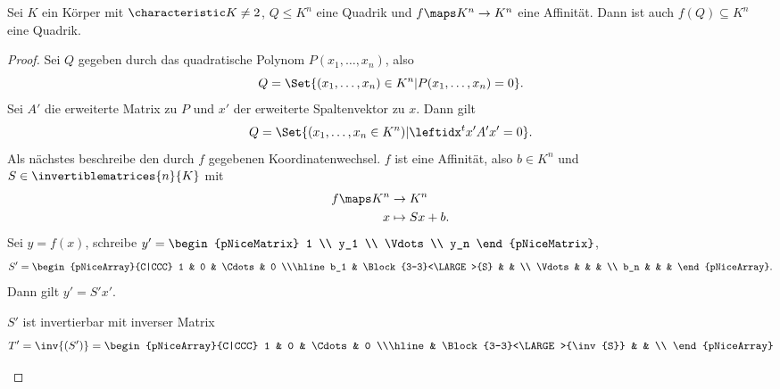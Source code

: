 \begin{lemma}\label{affinitaet_bildet_quadriken_auf_quadriken_ab}
  Sei \( K \) ein Körper mit \( \characteristic K\neq2 \), \( Q\leq K^n \) eine Quadrik und \( f\maps K^n\to K^n \) eine Affinität. Dann ist auch \( f(Q)\subseteq K^n \) eine Quadrik.
\end{lemma}
\begin{proof}
  Sei \( Q \) gegeben durch das quadratische Polynom \( P(x_1,\dotsc, x_n) \), also
  \begin{equation*}
    Q=\Set{(x_1,\dotsc,x_n)\in K^n|P(x_1,\dotsc,x_n)=0}.
  \end{equation*}
  Sei \( A' \) die erweiterte Matrix zu \( P \) und \( x' \) der erweiterte Spaltenvektor zu \( x \). Dann gilt
  \begin{align*}
    Q=\Set{(x_1,\dotsc,x_n\in K^n)|\transpose{x'}A'x'=0}.
  \end{align*}
  Als nächstes beschreibe den durch \( f \) gegebenen Koordinatenwechsel. \( f \) ist eine Affinität, also \texists \( b\in K^n \) und \( S\in \invertiblematrices{n}{K} \) mit
  \begin{equation*}
    \begin{split}
      f\maps K^n&\to K^n\\
      x&\mapsto Sx+b.
    \end{split}
  \end{equation*}
  Sei \( y=f(x) \), schreibe \( y'=\begin{pNiceMatrix} 1 \\ y_1 \\ \Vdots \\ y_n \end{pNiceMatrix} \),
  \begin{equation*}
    S'=\begin{pNiceArray}{C|CCC}
      1 & 0 & \Cdots & 0 \\\hline
      b_1 & \Block{3-3}<\LARGE>{S} &  & \\
      \Vdots & & & \\
      b_n & & &
    \end{pNiceArray}.
  \end{equation*}
  Dann gilt \( y'=S'x' \).
  \begin{bemerkung*}
    \( S' \) ist invertierbar mit inverser Matrix
    \begin{equation*}
      T'=\inv{(S')}=\begin{pNiceArray}{C|CCC}
        1 & 0 & \Cdots & 0 \\\hline
         & \Block{3-3}<\LARGE>{\inv{S}} &  & \\

\end{pNiceArray}
\end{equation*}
\end{bemerkung*}
\end{proof}
